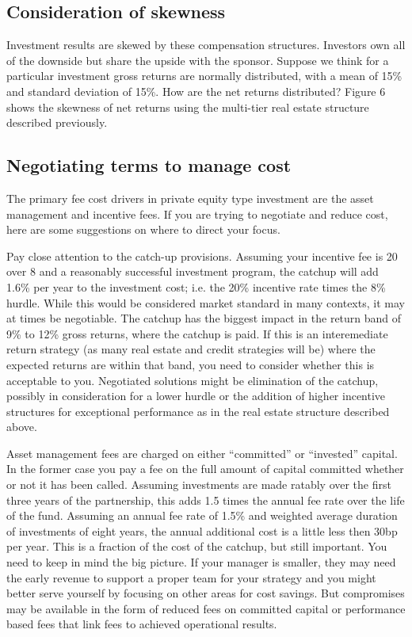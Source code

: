 \documentclass[12pt,english]{article}\usepackage[]{graphicx}\usepackage[]{color}
\begin{document}
\subsection*{Consideration of skewness}

Investment results are skewed by these compensation structures. Investors
own all of the downside but share the upside with the sponsor. Suppose
we think for a particular investment gross returns are normally distributed,
with a mean of 15\% and standard deviation of 15\%. How are the net
returns distributed? Figure 6 shows the skewness of net returns using
the multi-tier real estate structure described previously.

\subsection*{Negotiating terms to manage cost}

The primary fee cost drivers in private equity type investment are
the asset management and incentive fees. If you are trying to negotiate
and reduce cost, here are some suggestions on where to direct your
focus.

Pay close attention to the catch-up provisions. Assuming your incentive
fee is 20 over 8 and a reasonably successful investment program, the
catchup will add 1.6\% per year to the investment cost; i.e. the 20\%
incentive rate times the 8\% hurdle. While this would be considered
market standard in many contexts, it may at times be negotiable. The
catchup has the biggest impact in the return band of 9\% to 12\% gross
returns, where the catchup is paid. If this is an interemediate return
strategy (as many real estate and credit strategies will be) where
the expected returns are within that band, you need to consider whether
this is acceptable to you. Negotiated solutions might be elimination
of the catchup, possibly in consideration for a lower hurdle or the
addition of higher incentive structures for exceptional performance
as in the real estate structure described above.

Asset management fees are charged on either ``committed'' or ``invested''
capital. In the former case you pay a fee on the full amount of capital
committed whether or not it has been called. Assuming investments
are made ratably over the first three years of the partnership, this
adds 1.5 times the annual fee rate over the life of the fund. Assuming
an annual fee rate of 1.5\% and weighted average duration of investments
of eight years, the annual additional cost is a little less then 30bp
per year. This is a fraction of the cost of the catchup, but still
important. You need to keep in mind the big picture. If your manager
is smaller, they may need the early revenue to support a proper team
for your strategy and you might better serve yourself by focusing
on other areas for cost savings. But compromises may be available
in the form of reduced fees on committed capital or performance based
fees that link fees to achieved operational results.
\end{document}

